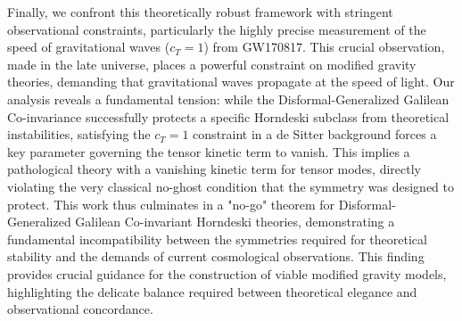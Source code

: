 \documentclass[twocolumn]{aastex631}
\begin{document}
Finally, we confront this theoretically robust framework with stringent observational constraints, particularly the highly precise measurement of the speed of gravitational waves ($c_T=1$) from GW170817. This crucial observation, made in the late universe, places a powerful constraint on modified gravity theories, demanding that gravitational waves propagate at the speed of light. Our analysis reveals a fundamental tension: while the Disformal-Generalized Galilean Co-invariance successfully protects a specific Horndeski subclass from theoretical instabilities, satisfying the $c_T=1$ constraint in a de Sitter background forces a key parameter governing the tensor kinetic term to vanish. This implies a pathological theory with a vanishing kinetic term for tensor modes, directly violating the very classical no-ghost condition that the symmetry was designed to protect. This work thus culminates in a "no-go" theorem for Disformal-Generalized Galilean Co-invariant Horndeski theories, demonstrating a fundamental incompatibility between the symmetries required for theoretical stability and the demands of current cosmological observations. This finding provides crucial guidance for the construction of viable modified gravity models, highlighting the delicate balance required between theoretical elegance and observational concordance.
\end{document}
